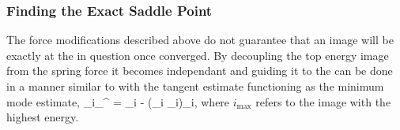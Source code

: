 \subsubsection{Finding the Exact Saddle Point}
The force modifications described above do not guarantee that an image will be exactly at the  in question once converged.
By decoupling the top energy image from the spring force it becomes independant and guiding it to the  can be done in a manner similar to  with the tangent estimate functioning as the minimum mode estimate,
\vF_{i_}^ = \vF_i - (\vF_i \cdot \uvt_i)\uvt_i,
\eeq
where $i_\text{max}$ refers to the image with the highest energy.~\cite{neb-ci-2000}

